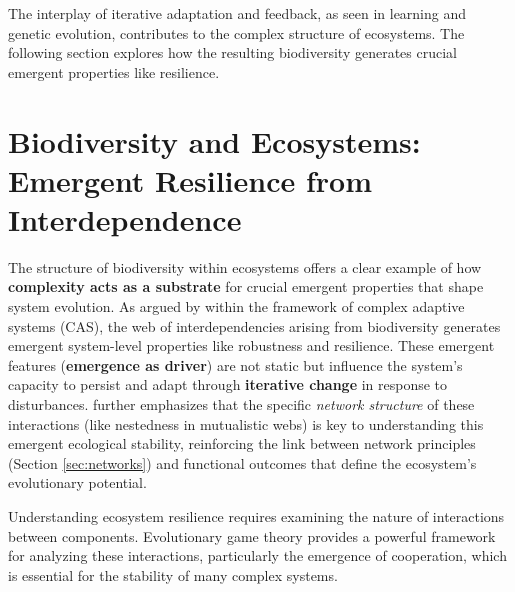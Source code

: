 \documentclass[12pt,openany]{book}
\begin{document}
The interplay of iterative adaptation and feedback, as seen in learning and genetic evolution, contributes to the complex structure of ecosystems. The following section explores how the resulting biodiversity generates crucial emergent properties like resilience.

\section{Biodiversity and Ecosystems: Emergent Resilience from Interdependence} \label{sec:biodiversity}
The structure of biodiversity within ecosystems offers a clear example of how \textbf{complexity acts as a substrate} for crucial emergent properties that shape system evolution. As argued by \citet{sole2022complex} within the framework of complex adaptive systems (CAS), the web of interdependencies arising from biodiversity generates emergent system-level properties like robustness and resilience. These emergent features (\textbf{emergence as driver}) are not static but influence the system's capacity to persist and adapt through \textbf{iterative change} in response to disturbances. \citet{bascompte2009disentangling} further emphasizes that the specific \emph{network structure} of these interactions (like nestedness in mutualistic webs) is key to understanding this emergent ecological stability, reinforcing the link between network principles (Section \ref{sec:networks}) and functional outcomes that define the ecosystem's evolutionary potential.

Understanding ecosystem resilience requires examining the nature of interactions between components. Evolutionary game theory provides a powerful framework for analyzing these interactions, particularly the emergence of cooperation, which is essential for the stability of many complex systems.

\end{document}
